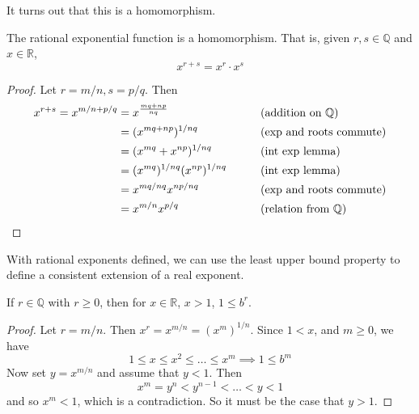   It turns out that this is a homomorphism. 

  \begin{corollary}
    The rational exponential function is a homomorphism. That is, given $r, s \in \mathbb{Q}$ and $x \in \mathbb{R}$, 
    \begin{equation}
      x^{r + s} = x^r \cdot x^s
    \end{equation}
  \end{corollary}
  \begin{proof}
    Let $r = m/n, s = p/q$. Then 
    \begin{align}
      x^{r+s} = x^{m/n + p/q} & = x^{\frac{mq + np}{nq}} && \tag{addition on $\mathbb{Q}$}\\
                              & = (x^{mq + np})^{1/nq} && \tag{exp and roots commute}\\
                              & = (x^{mq} + x^{np})^{1/nq} && \tag{int exp lemma}\\
                              & = (x^{mq})^{1/nq} (x^{np})^{1/nq} && \tag{int exp lemma}\\
                              & = x^{mq/nq} x^{np/nq} && \tag{exp and roots commute} \\
                              & = x^{m/n} x^{p/q} && \tag{relation from $\mathbb{Q}$}
    \end{align}
  \end{proof}

  With rational exponents defined, we can use the least upper bound property to define a consistent extension of a real exponent. 
  
  \begin{lemma} 
    If $r \in \mathbb{Q}$ with $r \geq 0$, then for $x \in \mathbb{R}$, $x > 1$, $1 \leq b^r$. 
  \end{lemma}
  \begin{proof}
    Let $r = m/n$. Then $x^r = x^{m/n} = (x^m)^{1/n}$. Since $1 < x$, and $m \geq 0$, we have 
    \begin{equation}
      1 \leq x \leq x^2 \leq \ldots \leq x^m \implies 1 \leq b^m
    \end{equation}
    Now set $y = x^{m/n}$ and assume that $y < 1$. Then 
    \begin{equation}
      x^m = y^n < y^{n-1} < \ldots < y < 1
    \end{equation}
    and so $x^m < 1$, which is a contradiction. So it must be the case that $y > 1$. 
  \end{proof}

